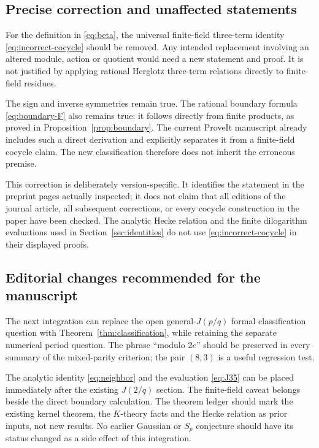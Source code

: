 \subsection{Precise correction and unaffected statements}

For the definition in \eqref{eq:beta}, the universal finite-field
three-term identity \eqref{eq:incorrect-cocycle} should be removed.
Any intended replacement involving an altered module, action or quotient
would need a new statement and proof. It is not justified by applying
rational Herglotz three-term relations directly to finite-field residues.

The sign and inverse symmetries remain true. The rational boundary
formula \eqref{eq:boundary-F} also remains true: it follows directly
from finite products, as proved in Proposition~\ref{prop:boundary}.
The current ProveIt manuscript already includes such a direct derivation
and explicitly separates it from a finite-field cocycle claim. The
new classification therefore does not inherit the erroneous premise.

This correction is deliberately version-specific. It identifies the
statement in the preprint pages actually inspected; it does not claim
that all editions of the journal article, all subsequent corrections,
or every cocycle construction in the paper have been checked. The
analytic Hecke relation and the finite dilogarithm evaluations used in
Section~\ref{sec:identities} do not use
\eqref{eq:incorrect-cocycle} in their displayed proofs.

\subsection{Editorial changes recommended for the manuscript}

The next integration can replace the open general-$J(p/q)$ formal
classification question with Theorem~\ref{thm:classification}, while
retaining the separate numerical period question. The phrase
``modulo $2e$'' should be preserved in every summary of the mixed-parity
criterion; the pair $(8,3)$ is a useful regression test.

The analytic identity \eqref{eq:neighbor} and the evaluation
\eqref{eq:J35} can be placed immediately after the existing $J(2/q)$
section. The finite-field caveat belongs beside the direct boundary
calculation. The theorem ledger should mark the existing kernel theorem,
the $K$-theory facts and the Hecke relation as prior inputs, not new
results. No earlier Gaussian or $S_p$ conjecture should have its status
changed as a side effect of this integration.
